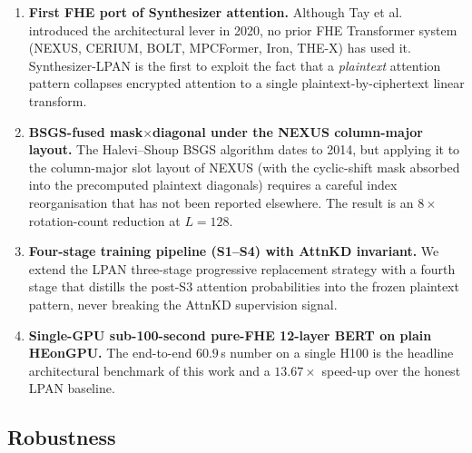 \documentclass[11pt,a4paper]{article}
\begin{document}
\begin{enumerate}[leftmargin=2em]
  \item \textbf{First FHE port of Synthesizer attention.}  Although
        Tay et al.\ \cite{tay2020synthesizer} introduced the
        architectural lever in 2020, no prior FHE Transformer system
        (NEXUS, CERIUM, BOLT, MPCFormer, Iron, THE-X) has used it.
        Synthesizer-LPAN is the first to exploit the fact that a
        \emph{plaintext} attention pattern collapses encrypted
        attention to a single plaintext-by-ciphertext linear transform.
  \item \textbf{BSGS-fused mask$\times$diagonal under the NEXUS column-major
        layout.}  The Halevi--Shoup BSGS algorithm dates to 2014, but
        applying it to the column-major slot layout of NEXUS (with the
        cyclic-shift mask absorbed into the precomputed plaintext
        diagonals) requires a careful index reorganisation that has
        not been reported elsewhere.  The result is an $8\times$
        rotation-count reduction at $L=128$.
  \item \textbf{Four-stage training pipeline (S1--S4) with AttnKD
        invariant.}  We extend the LPAN three-stage progressive
        replacement strategy with a fourth stage that distills the
        post-S3 attention probabilities into the frozen plaintext
        pattern, never breaking the AttnKD supervision signal.
  \item \textbf{Single-GPU sub-100-second pure-FHE 12-layer
        BERT on plain HEonGPU.}  The end-to-end $60.9$\,s number on a
        single H100 is the headline architectural benchmark of this
        work and a $13.67\times$ speed-up over the honest LPAN baseline.
\end{enumerate}

\subsection*{Robustness}
\end{document}
